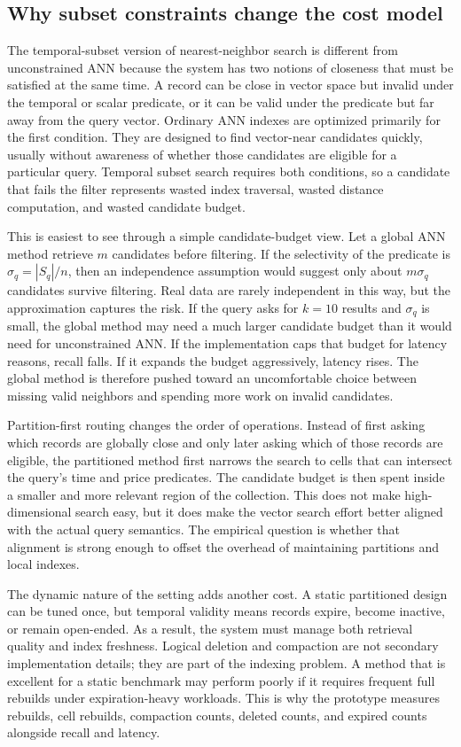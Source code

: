 \documentclass[sigconf,nonacm]{acmart}
\begin{document}
\subsection{Why subset constraints change the cost model}

The temporal-subset version of nearest-neighbor search is different from unconstrained ANN because the system has two notions of closeness that must be satisfied at the same time. A record can be close in vector space but invalid under the temporal or scalar predicate, or it can be valid under the predicate but far away from the query vector. Ordinary ANN indexes are optimized primarily for the first condition. They are designed to find vector-near candidates quickly, usually without awareness of whether those candidates are eligible for a particular query. Temporal subset search requires both conditions, so a candidate that fails the filter represents wasted index traversal, wasted distance computation, and wasted candidate budget.

This is easiest to see through a simple candidate-budget view. Let a global ANN method retrieve $m$ candidates before filtering. If the selectivity of the predicate is $\sigma_q = |S_q|/n$, then an independence assumption would suggest only about $m\sigma_q$ candidates survive filtering. Real data are rarely independent in this way, but the approximation captures the risk. If the query asks for $k=10$ results and $\sigma_q$ is small, the global method may need a much larger candidate budget than it would need for unconstrained ANN. If the implementation caps that budget for latency reasons, recall falls. If it expands the budget aggressively, latency rises. The global method is therefore pushed toward an uncomfortable choice between missing valid neighbors and spending more work on invalid candidates.

Partition-first routing changes the order of operations. Instead of first asking which records are globally close and only later asking which of those records are eligible, the partitioned method first narrows the search to cells that can intersect the query's time and price predicates. The candidate budget is then spent inside a smaller and more relevant region of the collection. This does not make high-dimensional search easy, but it does make the vector search effort better aligned with the actual query semantics. The empirical question is whether that alignment is strong enough to offset the overhead of maintaining partitions and local indexes.

The dynamic nature of the setting adds another cost. A static partitioned design can be tuned once, but temporal validity means records expire, become inactive, or remain open-ended. As a result, the system must manage both retrieval quality and index freshness. Logical deletion and compaction are not secondary implementation details; they are part of the indexing problem. A method that is excellent for a static benchmark may perform poorly if it requires frequent full rebuilds under expiration-heavy workloads. This is why the prototype measures rebuilds, cell rebuilds, compaction counts, deleted counts, and expired counts alongside recall and latency.
\end{document}
